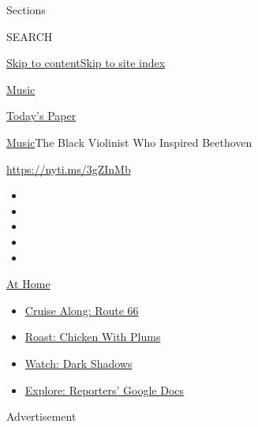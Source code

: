 Sections

SEARCH

\protect\hyperlink{site-content}{Skip to
content}\protect\hyperlink{site-index}{Skip to site index}

\href{https://www.nytimes3xbfgragh.onion/section/arts/music}{Music}

\href{https://myaccount.nytimes3xbfgragh.onion/auth/login?response_type=cookie\&client_id=vi}{}

\href{https://www.nytimes3xbfgragh.onion/section/todayspaper}{Today's
Paper}

\href{/section/arts/music}{Music}\textbar{}The Black Violinist Who
Inspired Beethoven

\url{https://nyti.ms/3gZInMb}

\begin{itemize}
\item
\item
\item
\item
\item
\end{itemize}

\href{https://www.nytimes3xbfgragh.onion/spotlight/at-home?action=click\&pgtype=Article\&state=default\&region=TOP_BANNER\&context=at_home_menu}{At
Home}

\begin{itemize}
\tightlist
\item
  \href{https://www.nytimes3xbfgragh.onion/2020/09/07/travel/route-66.html?action=click\&pgtype=Article\&state=default\&region=TOP_BANNER\&context=at_home_menu}{Cruise
  Along: Route 66}
\item
  \href{https://www.nytimes3xbfgragh.onion/2020/09/04/dining/sheet-pan-chicken.html?action=click\&pgtype=Article\&state=default\&region=TOP_BANNER\&context=at_home_menu}{Roast:
  Chicken With Plums}
\item
  \href{https://www.nytimes3xbfgragh.onion/2020/09/04/arts/television/dark-shadows-stream.html?action=click\&pgtype=Article\&state=default\&region=TOP_BANNER\&context=at_home_menu}{Watch:
  Dark Shadows}
\item
  \href{https://www.nytimes3xbfgragh.onion/interactive/2020/at-home/even-more-reporters-editors-diaries-lists-recommendations.html?action=click\&pgtype=Article\&state=default\&region=TOP_BANNER\&context=at_home_menu}{Explore:
  Reporters' Google Docs}
\end{itemize}

Advertisement

